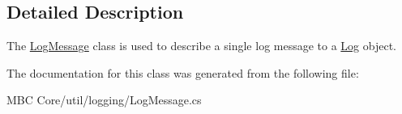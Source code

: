 \subsection{Detailed Description}
The \hyperlink{class_m_b_c_1_1_core_1_1util_1_1_log_message}{Log\-Message} class is used to describe a single log message to a \hyperlink{class_m_b_c_1_1_core_1_1util_1_1_log}{Log} object.

The documentation for this class was generated from the following file\-:\begin{DoxyCompactItemize}
\item 
M\-B\-C Core/util/logging/Log\-Message.\-cs\end{DoxyCompactItemize}
